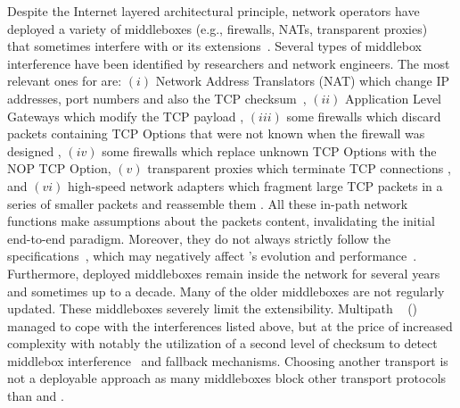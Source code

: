 Despite the Internet layered architectural principle, network operators have
deployed a variety of middleboxes (e.g., firewalls, NATs, transparent 
proxies)~\cite{mCloud} that sometimes interfere with \tcp or its 
extensions~\cite{medina2004measuring, honda2011still, edeline2019bottom}. 
Several types of middlebox interference have been identified by researchers and 
network engineers. The most relevant ones for \tcp are: $(i)$ Network Address 
Translators (NAT) which change IP addresses, port numbers and also the TCP 
checksum~\cite{wang2011untold}, $(ii)$ Application Level Gateways which 
modify the TCP payload \cite{rfc3207}, $(iii)$ some firewalls which discard 
packets containing TCP Options that were not known when the firewall was 
designed \cite{edeline2020evaluating}, $(iv)$ some firewalls which replace 
unknown TCP Options with the NOP TCP Option, $(v)$ transparent proxies which 
terminate TCP connections 
\cite{weaver2014here}, and $(vi)$ high-speed network adapters which fragment 
large TCP packets in a series of smaller packets and reassemble them 
\cite{honda2011still}. 
All these in-path network functions make assumptions about the \tcp packets content, invalidating the initial \tcp end-to-end paradigm. Moreover, they do not always strictly follow the \tcp specifications~\cite{honda2011still, hesmans2013tcp}, which may negatively affect \tcp's evolution and performance~\cite{edeline2020evaluating}. Furthermore, deployed middleboxes remain inside the network for several years and sometimes up to a decade. Many of the older middleboxes are not regularly updated. 
These middleboxes severely limit the \tcp extensibility. Multipath 
\tcp~\cite{rfc8684,raiciu2012hard} (\mptcp) managed to cope with the 
interferences listed above, but at the price of increased complexity with 
notably the utilization of a second level of checksum to detect middlebox 
interference~\cite{raiciu2012hard,hesmans2013tcp} and fallback mechanisms. 
Choosing another transport is not a deployable approach as many middleboxes 
block other transport protocols than \tcp and \udp \cite{barik2020usability}.

